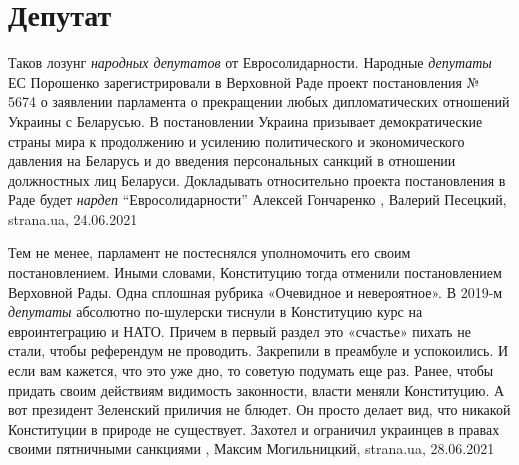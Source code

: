  
 
 
 
 
\chapter{Депутат}
\label{sec:slova.deputat}

Таков лозунг \emph{народных депутатов} от Евросолидарности.  Народные
\emph{депутаты} ЕС Порошенко зарегистрировали в Верховной Раде проект
постановления № 5674 о заявлении парламента о прекращении любых дипломатических
отношений Украины с Беларусью. В постановлении Украина призывает
демократические страны мира к продолжению и усилению политического и
экономического давления на Беларусь и до введения персональных санкций в
отношении должностных лиц Беларуси. Докладывать относительно проекта
постановления в Раде будет \emph{нардеп} \enquote{Евросолидарности} Алексей
Гончаренко
, 
Валерий Песецкий, strana.ua, 24.06.2021

Тем не менее, парламент не постеснялся уполномочить его своим постановлением.
Иными словами, Конституцию тогда отменили постановлением Верховной Рады. Одна
сплошная рубрика «Очевидное и невероятное».  В 2019-м \emph{депутаты} абсолютно
по-шулерски тиснули в Конституцию курс на евроинтеграцию и НАТО. Причем в
первый раздел это «счастье» пихать не стали, чтобы референдум не проводить.
Закрепили в преамбуле и успокоились.  И если вам кажется, что это уже дно, то
советую подумать еще раз. Ранее, чтобы придать своим действиям видимость
законности, власти меняли Конституцию. А вот президент Зеленский приличия не
блюдет. Он просто делает вид, что никакой Конституции в природе не существует.
Захотел и ограничил украинцев в правах своими пятничными санкциями
, 
Максим Могильницкий, strana.ua, 28.06.2021


